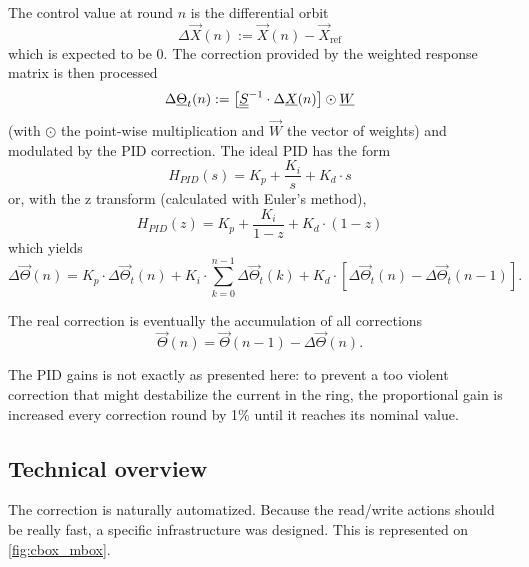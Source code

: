 The control value at round $n$ is the differential orbit 
\begin{equation}
 \Delta \vec{X}(n) := \vec{X}(n)-\vec{X}_\text{ref}
\end{equation}
which is expected to be 0. The correction provided by the weighted response matrix is then processed
\begin{equation}
\Delta \underline{\Theta}_t(n) :=  \left[ \underline{\underline{S}}^{-1} \cdot \Delta \underline{X}(n) \right] \odot \underline{W}
\end{equation}
(with $\odot$ the point-wise multiplication and $\vec{W}$ the vector of weights) and modulated by the PID correction. The ideal PID has the form
\begin{equation}
H_{PID}(s) = K_p + \frac{K_i}{s} + K_d \cdot s 
\end{equation}
or, with the z transform (calculated with Euler's method),
\begin{equation}
H_{PID}(z) = K_p + \frac{K_i}{1-z} + K_d \cdot (1-z)
\end{equation}
which yields
\begin{equation}
\Delta \vec{\Theta}(n) =  K_p \cdot \Delta \vec{\Theta}_t(n) + K_i \cdot \sum\limits_{k=0}^{n-1}\Delta \vec{\Theta}_t(k) + K_d \cdot \left[\Delta \vec{\Theta}_t(n) - \Delta \vec{\Theta}_t(n-1)\right].
\end{equation}

The real correction is eventually the accumulation of all corrections
\begin{equation}
\vec{\Theta}(n) = \vec{\Theta}(n-1) - \Delta \vec{\Theta}(n).
\end{equation}

\remark The PID gains is not exactly as presented here: to prevent a too violent correction that might destabilize the current in the ring, the proportional gain is increased every correction round by 1\% until it reaches its nominal value.

\subsection{Technical overview}

The correction is naturally automatized. Because the read/write actions should be really fast, a specific infrastructure was designed. This is represented on \cref{fig:cbox_mbox}. 

